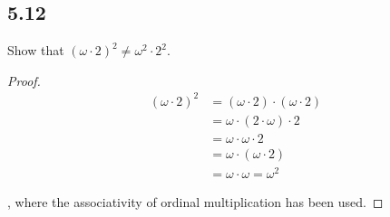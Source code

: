 \subsection*{5.12} Show that $(\omega \cdot 2)^2 \neq \omega ^2 \cdot 2^2$.

\begin{proof}
    \begin{align*}
        (\omega \cdot 2)^2 &= (\omega \cdot 2) \cdot (\omega \cdot 2) \\
                           &= \omega \cdot (2 \cdot \omega) \cdot 2 \\
                           &= \omega \cdot \omega \cdot 2 \\
                           &= \omega \cdot (\omega \cdot 2) \\
                           &= \omega \cdot \omega = \omega^2
    \end{align*}

    , where the associativity of ordinal multiplication has been used.
\end{proof}

